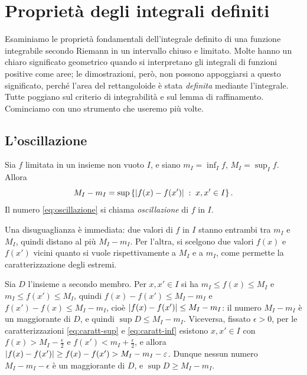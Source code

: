 \section{Proprietà degli integrali definiti}
\label{sec:proprieta-integrale}

Esaminiamo le proprietà fondamentali dell'integrale definito di una funzione
integrabile secondo Riemann in un intervallo chiuso e limitato. Molte hanno un chiaro
significato geometrico quando si interpretano gli integrali di funzioni positive come
aree; le dimostrazioni, però, non possono appoggiarsi a questo significato, perché
l'area del rettangoloide è stata \emph{definita} mediante l'integrale. Tutte poggiano
sul criterio di integrabilità e sul lemma di raffinamento. Cominciamo con uno strumento
che useremo più volte.

\subsection{L'oscillazione}

\begin{lemma}[Oscillazione]\label{lem:oscillazione}
Sia $f$ limitata in un insieme non vuoto $I$, e siano $m_{I}=\inf_{I}f$,
$M_{I}=\sup_{I}f$. Allora
\begin{equation}\label{eq:oscillazione}
  M_{I}-m_{I}=\sup\left\{ \lvert f(x)-f(x')\rvert \;:\; x,x'\in I \right\} .
\end{equation}
Il numero \eqref{eq:oscillazione} si chiama \emph{oscillazione} di $f$ in $I$.
\end{lemma}

\begin{schema}
\end{schema}

\begin{strategia}
Una disuguaglianza è immediata: due valori di $f$ in $I$ stanno entrambi tra $m_{I}$ e
$M_{I}$, quindi distano al più $M_{I}-m_{I}$. Per l'altra, si scelgono due valori
$f(x)$ e $f(x')$ vicini quanto si vuole rispettivamente a $M_{I}$ e a $m_{I}$, come
permette la caratterizzazione degli estremi.
\end{strategia}

\begin{dimostrazione}
Sia $D$ l'insieme a secondo membro. Per $x,x'\in I$ si ha $m_{I}\le f(x)\le M_{I}$ e
$m_{I}\le f(x')\le M_{I}$, quindi $f(x)-f(x')\le M_{I}-m_{I}$ e
$f(x')-f(x)\le M_{I}-m_{I}$, cioè $\lvert f(x)-f(x')\rvert\le M_{I}-m_{I}$: il numero
$M_{I}-m_{I}$ è un maggiorante di $D$, e quindi $\sup D\le M_{I}-m_{I}$. Viceversa, fissato
$\epsilon>0$, per le caratterizzazioni \eqref{eq:caratt-sup} e \eqref{eq:caratt-inf}
esistono $x,x'\in I$ con $f(x)>M_{I}-\frac\epsilon2$ e $f(x')<m_{I}+\frac\epsilon2$, e allora
$\lvert f(x)-f(x')\rvert\ge f(x)-f(x')>M_{I}-m_{I}-\varepsilon$. Dunque nessun numero
$M_{I}-m_{I}-\epsilon$ è un maggiorante di $D$, e $\sup D\ge M_{I}-m_{I}$.
\end{dimostrazione}

